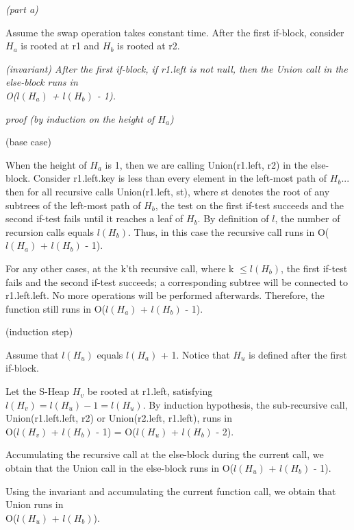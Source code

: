 \documentclass[a4paper, 10pt]{article}
\begin{document}
{\setmainfont{Arial}
{\noindent\large\it(part a)}

Assume the swap operation takes constant time. After the first if-block, consider $H_a$ is rooted at r1 and $H_b$ is rooted at r2.

{\it
(invariant) After the first if-block, if r1.left is not null, then the Union call in the else-block runs in \\\indent\indent O($l(H_a)$ + $l(H_b)$ - 1).
}
\begin{addmargin}[15pt]{0in}
{
\textit{proof (by induction on the height of $H_a$)}

{\noindent (base case)}

When the height of $H_a$ is 1, then we are calling Union(r1.left, r2) in the else-block. Consider r1.left.key is less than every element in the left-most path of $H_b$... then for all recursive calls Union(r1.left, st), where st denotes the root of any subtrees of the left-most path of $H_b$, the test on the first if-test succeeds and the second if-test fails until it reaches a leaf of $H_b$. By definition of $l$, the number of recursion calls equals $l(H_b)$. Thus, in this case the recursive call runs in O($l(H_a)$ + $l(H_b)$ - 1).

For any other cases, at the k'th recursive call, where k $\le l(H_b)$, the first if-test fails and the second if-test succeeds; a corresponding subtree will be connected to r1.left.left. No more operations will be performed afterwards. Therefore, the function still runs in O($l(H_a)$ + $l(H_b)$ - 1).

{\noindent (induction step)}

Assume that $l(H_u)$ equals $l(H_a)$ + 1. Notice that $H_u$ is defined after the first if-block.

Let the S-Heap $H_v$ be rooted at r1.left, satisfying $l(H_v) = l(H_u) - 1 = l(H_u)$. By induction hypothesis, the sub-recursive call, Union(r1.left.left, r2) or Union(r2.left, r1.left), runs in \\O($l(H_v)$ + $l(H_b)$ - 1) = O($l(H_u)$ + $l(H_b)$ - 2).

Accumulating the recursive call at the else-block during the current call, we obtain that the Union call in the else-block runs in O($l(H_u)$ + $l(H_b)$ - 1).
}
\end{addmargin}

Using the invariant and accumulating the current function call, we obtain that Union runs in \\O($l(H_u)$ + $l(H_b)$).

}
\end{document}
